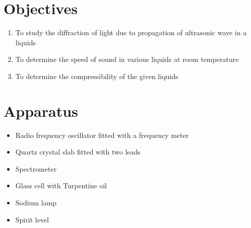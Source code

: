 \section{Objectives}
	\begin{enumerate}
		\item To study the diffraction of light due to propagation of ultrasonic wave in a liquids
		\item To determine the speed of sound in various liquids at room temperature 
		\item To determine the compressibility of the given liquids
	\end{enumerate}


\section{Apparatus}
	\begin{itemize}
		\item Radio frequency oscillator fitted with a frequency meter
		\item Quartz crystal slab fitted with two leads
		\item Spectrometer
		\item Glass cell with Turpentine oil
		\item Sodium lamp
		\item Spirit level
	\end{itemize}
